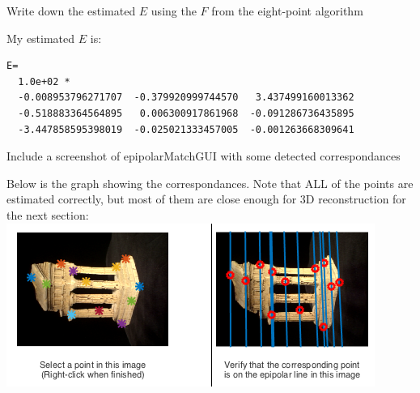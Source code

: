 \documentclass[12pt,letterpaper,boxed]{hmcpset}
\begin{document}
\begin{problem}[2.3]
Write down the estimated $E$ using the $F$ from the eight-point algorithm
\end{problem}
\begin{solution}
My estimated $E$ is:

\begin{verbatim}
E=
  1.0e+02 *
  -0.008953796271707  -0.379920999744570   3.437499160013362
  -0.518883364564895   0.006300917861968  -0.091286736435895
  -3.447858595398019  -0.025021333457005  -0.001263668309641
\end{verbatim}
\end{solution}

\begin{problem}[2.6]
Include a screenshot of epipolarMatchGUI with some detected correspondances
\end{problem}
\begin{solution}
Below is the graph showing the correspondances. Note that ALL of the points are 
estimated correctly, but most of them are close enough for 3D reconstruction for
the next section:\\
\includegraphics[width=\textwidth]{q2_6.png}
\end{solution}
\end{document}
